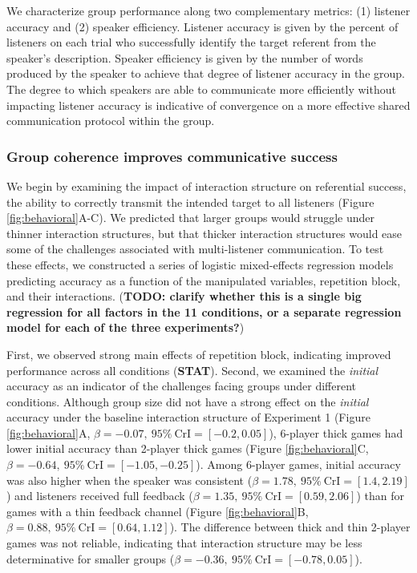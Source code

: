 \documentclass[
  english,
  a4paper,
]{article}
\begin{document}
We characterize group performance along two complementary metrics: (1) listener accuracy and (2) speaker efficiency.
Listener accuracy is given by the percent of listeners on each trial who successfully identify the target referent from the speaker's description.
Speaker efficiency is given by the number of words produced by the speaker to achieve that degree of listener accuracy in the group.
The degree to which speakers are able to communicate more efficiently without impacting listener accuracy is indicative of convergence on a more effective shared communication protocol within the group.

\hypertarget{group-coherence-improves-communicative-success}{%
\subsubsection{Group coherence improves communicative success}\label{group-coherence-improves-communicative-success}}

We begin by examining the impact of interaction structure on referential success, the ability to correctly transmit the intended target to all listeners (Figure \ref{fig:behavioral}A-C).
We predicted that larger groups would struggle under thinner interaction structures, but that thicker interaction structures would ease some of the challenges associated with multi-listener communication.
To test these effects, we constructed a series of logistic mixed-effects regression models predicting accuracy as a function of the manipulated variables, repetition block, and their interactions. (\textbf{TODO: clarify whether this is a single big regression for all factors in the 11 conditions, or a separate regression model for each of the three experiments?})

First, we observed strong main effects of repetition block, indicating improved performance across all conditions (\textbf{STAT}).
Second, we examined the \emph{initial} accuracy as an indicator of the challenges facing groups under different conditions.
Although group size did not have a strong effect on the \emph{initial} accuracy under the baseline interaction structure of Experiment 1 (Figure \ref{fig:behavioral}A, \(\beta=-0.07,\:95\%\:\mathrm{CrI}=[-0.2, 0.05]\)), 6-player thick games had lower initial accuracy than 2-player thick games (Figure \ref{fig:behavioral}C, \(\beta=-0.64,\:95\%\:\mathrm{CrI}=[-1.05, -0.25]\)).
Among 6-player games, initial accuracy was also higher when the speaker was consistent (\(\beta=1.78,\:95\%\:\mathrm{CrI}=[1.4, 2.19]\)) and listeners received full feedback (\(\beta=1.35,\:95\%\:\mathrm{CrI}=[0.59, 2.06]\)) than for games with a thin feedback channel (Figure \ref{fig:behavioral}B, \(\beta=0.88,\:95\%\:\mathrm{CrI}=[0.64, 1.12]\)).
The difference between thick and thin 2-player games was not reliable, indicating that interaction structure may be less determinative for smaller groups (\(\beta=-0.36,\:95\%\:\mathrm{CrI}=[-0.78, 0.05]\)).
\end{document}
